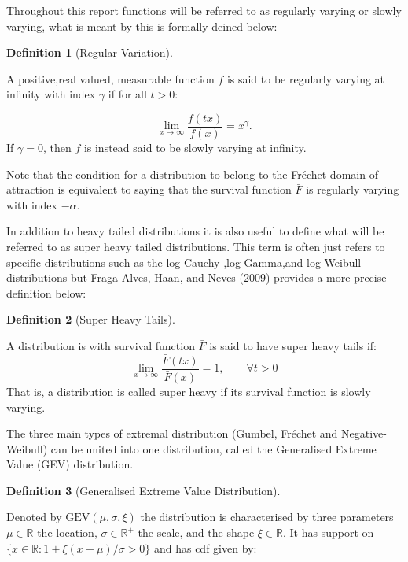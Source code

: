 \documentclass[
  10pt,
  a4paper,
]{scrreprt}
\theoremstyle{plain}
\theoremstyle{plain}
\theoremstyle{plain}
\theoremstyle{definition}
\newtheorem{definition}{Definition}[section]
\theoremstyle{remark}
\begin{document}
{Throughout this report functions will be referred to as regularly
varying or slowly varying, what is meant by this is formally deined
below:

\begin{definition}[Regular
Variation]\protect\hypertarget{def-rv}{}\label{def-rv}

A positive,real valued, measurable function \(f\) is said to be
regularly varying at infinity with index \(\gamma\) if for all \(t>0\):

\[
\lim_{x\rightarrow\infty}\displaystyle\frac{f(tx)}{f(x)} = x^{\gamma}.
\] If \(\gamma =0\), then \(f\) is instead said to be slowly varying at
infinity.

\end{definition}

Note that the condition for a distribution to belong to the Fréchet
domain of attraction is equivalent to saying that the survival function
\(\bar F\) is regularly varying with index \(-\alpha\).

In addition to heavy tailed distributions it is also useful to define
what will be referred to as super heavy tailed distributions. This term
is often just refers to specific distributions such as the log-Cauchy
,log-Gamma,and log-Weibull distributions but Fraga Alves, Haan, and
Neves (2009) provides a more precise definition below:

\begin{definition}[Super Heavy
Tails]\protect\hypertarget{def-sup}{}\label{def-sup}

A distribution is with survival function \(\bar F\) is said to have
super heavy tails if: \[
\lim_{x\rightarrow\infty}\displaystyle\frac{\bar F(tx)}{\bar F (x)} = 1,\qquad \forall t>0
\] That is, a distribution is called super heavy if its survival
function is slowly varying.

\end{definition}

The three main types of extremal distribution (Gumbel, Fréchet and
Negative-Weibull) can be united into one distribution, called the
Generalised Extreme Value (GEV) distribution.

\begin{definition}[Generalised Extreme Value
Distribution]\protect\hypertarget{def-gev}{}\label{def-gev}

Denoted by \(\text{GEV}(\mu,\sigma,\xi)\) the distribution is
characterised by three parameters \(\mu \in \mathbb R\) the location,
\(\sigma\in \mathbb R^+\) the scale, and the shape \(\xi\in \mathbb R\).
It has support on \(\{x\in \mathbb R:1+\xi(x-\mu)/\sigma > 0\}\) and has
cdf given by:


\end{definition}}
\end{document}
